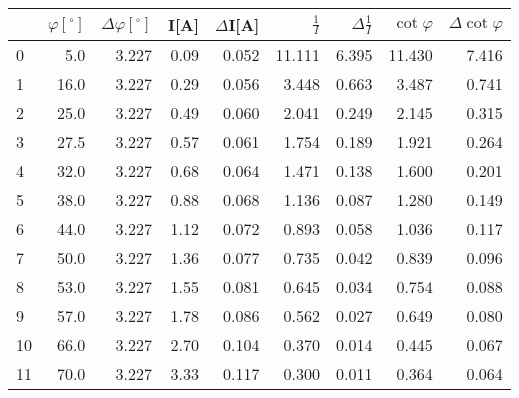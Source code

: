 \begin{tabular}{lrrrrrrrr}
\toprule
{} &  $\varphi[^\circ]$ &  $\Delta \varphi[^\circ]$ &  I[A] &  $\Delta$I[A] &  $\frac{1}{I}$ &  $\Delta \frac{1}{I}$ &  $\cot{\varphi}$ &  $\Delta \cot{\varphi}$ \\
\midrule
0  &                5.0 &                     3.227 &  0.09 &         0.052 &         11.111 &                 6.395 &           11.430 &                   7.416 \\
1  &               16.0 &                     3.227 &  0.29 &         0.056 &          3.448 &                 0.663 &            3.487 &                   0.741 \\
2  &               25.0 &                     3.227 &  0.49 &         0.060 &          2.041 &                 0.249 &            2.145 &                   0.315 \\
3  &               27.5 &                     3.227 &  0.57 &         0.061 &          1.754 &                 0.189 &            1.921 &                   0.264 \\
4  &               32.0 &                     3.227 &  0.68 &         0.064 &          1.471 &                 0.138 &            1.600 &                   0.201 \\
5  &               38.0 &                     3.227 &  0.88 &         0.068 &          1.136 &                 0.087 &            1.280 &                   0.149 \\
6  &               44.0 &                     3.227 &  1.12 &         0.072 &          0.893 &                 0.058 &            1.036 &                   0.117 \\
7  &               50.0 &                     3.227 &  1.36 &         0.077 &          0.735 &                 0.042 &            0.839 &                   0.096 \\
8  &               53.0 &                     3.227 &  1.55 &         0.081 &          0.645 &                 0.034 &            0.754 &                   0.088 \\
9  &               57.0 &                     3.227 &  1.78 &         0.086 &          0.562 &                 0.027 &            0.649 &                   0.080 \\
10 &               66.0 &                     3.227 &  2.70 &         0.104 &          0.370 &                 0.014 &            0.445 &                   0.067 \\
11 &               70.0 &                     3.227 &  3.33 &         0.117 &          0.300 &                 0.011 &            0.364 &                   0.064 \\
\bottomrule
\end{tabular}
